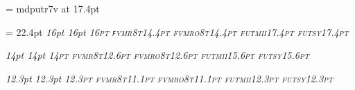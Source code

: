 \def\ttfontprefix{fvm}

\def\ttshape{r8t}
\def\ttbshape{b8t}
\def\ttslshape{ro8t}
\def\ttbslshape{bo8t}

\def\mtfontprefix{fut}

\def\mtitshape{mii}			%
\def\mtsyshape{sy}			%
\font\elevenex=  mdputr7v at 17.4pt 	%

\ifx\bigger\relax
  \def\textfontsize{17.4pt}
  \setfont\textrm\rmfontprefix\rmshape{\textfontsize}
\else
  \def\textfontsize{16pt}
  \textleading = 22.4pt %
  \setfont\textrm\rmfontprefix\rmshape{\textfontsize}
\fi
\setfont\textbf\rmfontprefix\bfshape{\textfontsize}
\setfont\textit\rmfontprefix\itshape{\textfontsize}
\setfont\textsl\rmfontprefix\slshape{\textfontsize}
\setfont\textsc\rmfontprefix\scshape{\textfontsize}
\setfont\texttt\ttfontprefix\ttshape{14.4pt}	%
\setfont\textttsl\ttfontprefix\ttslshape{14.4pt}	%
\setfont\texti\mtfontprefix\mtitshape{17.4pt}	%
\setfont\textsy\mtfontprefix\mtsyshape{17.4pt}	%

\setfont{}\rmfontprefix\bxshape{14.5pt} %
\def\df{\let\tentt=\deftt \let\tenbf = \defbf \bf}

\def\smallfontsize{14pt}		%
\setfont\smallrm\rmfontprefix\rmshape{\smallfontsize}
\setfont\smallbf\rmfontprefix\bfshape{\smallfontsize}
\setfont\smallit\rmfontprefix\itshape{\smallfontsize}
\setfont\smallsl\rmfontprefix\slshape{\smallfontsize}
\setfont\smallsc\rmfontprefix\scshape{\smallfontsize}
\setfont\smalltt\ttfontprefix\ttshape{12.6pt}
\setfont\smallttsl\ttfontprefix\ttslshape{12.6pt}
\setfont\smalli\mtfontprefix\mtitshape{15.6pt}
\setfont\smallsy\mtfontprefix\mtsyshape{15.6pt}

\def\smallerfontsize{12.3pt}		%
\setfont\smallerrm\rmfontprefix\rmshape{\smallerfontsize}
\setfont\smallerbf\rmfontprefix\bfshape{\smallerfontsize}
\setfont\smallerit\rmfontprefix\itshape{\smallerfontsize}
\setfont\smallersl\rmfontprefix\slshape{\smallerfontsize}
\setfont\smallersc\rmfontprefix\scshape{\smallerfontsize}
\setfont\smallertt\ttfontprefix\ttshape{11.1pt}
\setfont\smallerttsl\ttfontprefix\ttslshape{11.1pt}
\setfont\smalleri\mtfontprefix\mtitshape{\smallerfontsize}
\setfont\smallersy\mtfontprefix\mtsyshape{\smallerfontsize}

